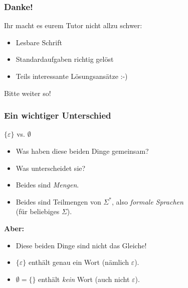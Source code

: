 


\begin{frame}
	\frametitle{Danke!}
	
	Ihr macht es eurem Tutor nicht allzu schwer:
	
	\begin{itemize}
		\item Lesbare Schrift
		\item Standardaufgaben richtig gelöst
		\item Teils interessante Lösungsansätze :-)
	\end{itemize}
	
	Bitte weiter so!
\end{frame}

\begin{frame}
	\frametitle{Ein wichtiger Unterschied}
	
	\begin{center}
		\huge{$\{\varepsilon\}$ vs. $\emptyset$}
	\end{center}
	
	\begin{itemize}
		\item Was haben diese beiden Dinge gemeinsam?
		\item Was unterscheidet sie?
	\end{itemize}
	
	\pause
	
	\begin{itemize}
		\item Beides sind \emph{Mengen}.
		\item Beides sind Teilmengen von $\Sigma^*$, also \emph{formale Sprachen} \\ (für beliebiges $\Sigma$).
	\end{itemize}
	
	\pause
	
	\textbf{Aber:}
	
	\begin{itemize}
		\item Diese beiden Dinge sind nicht das Gleiche!
		\item $\{\varepsilon\}$ enthält genau ein Wort (nämlich $\varepsilon$).
		\item $\emptyset = \{\}$ enthält \emph{kein} Wort (auch nicht $\varepsilon$).
	\end{itemize}
\end{frame}

